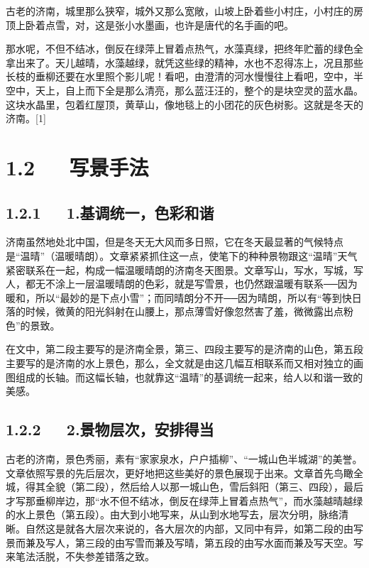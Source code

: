 \documentclass[letterpaper,10pt,english]{sphinxmanual}
\begin{document}
古老的济南，城里那么狭窄，城外又那么宽敞，山坡上卧着些小村庄，小村庄的房顶上卧着点雪，对，这是张小水墨画，也许是唐代的名手画的吧。

那水呢，不但不结冰，倒反在绿萍上冒着点热气，水藻真绿，把终年贮蓄的绿色全拿出来了。天儿越晴，水藻越绿，就凭这些绿的精神，水也不忍得冻上，况且那些长枝的垂柳还要在水里照个影儿呢！看吧，由澄清的河水慢慢往上看吧，空中，半空中，天上，自上而下全是那么清亮，那么蓝汪汪的，整个的是块空灵的蓝水晶。这块水晶里，包着红屋顶，黄草山，像地毯上的小团花的灰色树影。这就是冬天的济南。{[}1{]}


\section{1.2   写景手法}
\label{\detokenize{p01_u6563_u6587/_u8001_u820d-_u6d4e_u5357_u7684_u51ac_u5929:id4}}

\subsection{1.2.1   1.基调统一，色彩和谐}
\label{\detokenize{p01_u6563_u6587/_u8001_u820d-_u6d4e_u5357_u7684_u51ac_u5929:id5}}
济南虽然地处北中国，但是冬天无大风而多日照，它在冬天最显著的气候特点是“温晴”（温暖晴朗）。文章紧紧抓住这一点，使笔下的种种景物跟这“温晴”天气紧密联系在一起，构成一幅温暖晴朗的济南冬天图景。文章写山，写水，写城，写人，都无不涂上一层温暖晴朗的色彩，就是写雪景，也仍然跟温暖有联系──因为暖和，所以“最妙的是下点小雪”；而同晴朗分不开──因为晴朗，所以有“等到快日落的时候，微黄的阳光斜射在山腰上，那点薄雪好像忽然害了羞，微微露出点粉色”的景致。

在文中，第二段主要写的是济南全景，第三、四段主要写的是济南的山色，第五段主要写的是济南的水上景色，那么，全文就是由这几幅互相联系而又相对独立的画图组成的长轴。而这幅长轴，也就靠这“温晴”的基调统一起来，给人以和谐一致的美感。


\subsection{1.2.2   2.景物层次，安排得当}
\label{\detokenize{p01_u6563_u6587/_u8001_u820d-_u6d4e_u5357_u7684_u51ac_u5929:id6}}
古老的济南，景色秀丽，素有“家家泉水，户户插柳”、“一城山色半城湖”的美誉。文章依照写景的先后层次，更好地把这些美好的景色展现于出来。文章首先鸟瞰全城，得其全貌（第二段），然后给人以那一城山色，雪后斜阳（第三、四段），最后才写那垂柳岸边，那“水不但不结冰，倒反在绿萍上冒着点热气”，而水藻越晴越绿的水上景色（第五段）。由大到小地写来，从山到水地写去，层次分明，脉络清晰。自然这是就各大层次来说的，各大层次的内部，又同中有异，如第二段的由写景而兼及写人，第三段的由写雪而兼及写晴，第五段的由写水面而兼及写天空。写来笔法活脱，不失参差错落之致。
\end{document}

